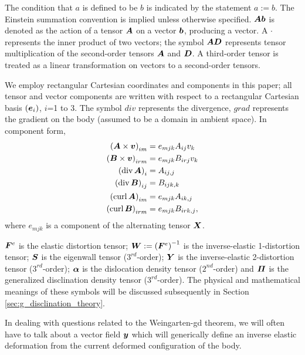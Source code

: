 \documentclass[11pt,letterpaper]{article}
\begin{document}
The condition that $a$ is defined to be $b$ is indicated by the statement $a := b$. 
The Einstein summation convention is implied unless otherwise specified. $\bfA \bfb$ is denoted as the action of a tensor $\bfA$ on
a vector $\bfb$, producing a vector. A $\cdot$
represents the inner product of two vectors; the symbol $\bfA\bfD$
represents tensor multiplication of the second-order tensors
$\bfA$ and $\bfD$. A third-order tensor is treated as a linear
transformation on vectors to a second-order tensors. 

 We employ rectangular Cartesian coordinates and components in this paper; all tensor and vector components are written with respect to a rectangular Cartesian basis  
$(\bfe_i)$, $i$=1 to 3. The symbol $div$ represents the divergence, $grad$ represents the
gradient on the body (assumed to be a domain in ambient space). In component form, 
\begin{equation*}
 \begin{split}
    \left(\bfA\times\bfv\right)_{im} &= e_{mjk} A_{ij} v_{k}    \\
    \left(\bfB\times\bfv\right)_{irm} &= e_{mjk} B_{irj} v_{k}  \\
    \left(\divergence\bfA\right)_{i} &= A_{ij,j}                \\
    \left(\divergence\bfB\right)_{ij} &= B_{ijk,k}              \\
    \left(\curl\bfA\right)_{im} &= e_{mjk} A_{ik,j}             \\
    \left(\curl\bfB\right)_{irm} &= e_{mjk} B_{irk,j},             \\
 \end{split}
\end{equation*}
where $e_{mjk}$ is a component of the alternating tensor $\bfX$.

$\bfF^e$ is the elastic distortion tensor; $\bfW := \left(\bfF^e\right)^{-1}$ is the inverse-elastic 1-distortion tensor; $\bfS$ is the eigenwall tensor ($3^{rd}$-order); $\bfY$ is the inverse-elastic 2-distortion tensor ($3^{rd}$-order); $\bfalpha$ is the dislocation density tensor ($2^{nd}$-order) and $\bfPi$ is the generalized disclination density tensor ($3^{rd}$-order). The physical and mathematical meanings of these symbols will be discussed subsequently in Section \ref{sec:g_disclination_theory}.

In dealing with questions related to the Weingarten-gd theorem, we will often have to talk about a vector field $\bfy$  which will generically define an inverse elastic deformation from the current deformed configuration of the body.
\end{document}
